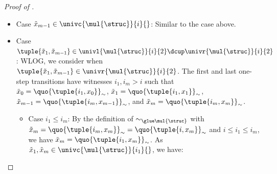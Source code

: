 \begin{proof}[Proof of ]
\begin{itemize}
\begin{itemize}
            We then have:
            \begin{center}
            \end{center}
            \item Case $\tilde{x}_{m-1} \in \univc{\mul{\struc}}{i}{}$:
            Similar to the case above.
            \item Case $\tuple{\tilde{x}_1, \tilde{x}_{m-1}} \in \univl{\mul{\struc}}{i}{2} \dcup \univr{\mul{\struc}}{i}{2}$:
            WLOG, we consider when $\tuple{\tilde{x}_1, \tilde{x}_{m-1}} \in \univr{\mul{\struc}}{i}{2}$.
            The first and last one-step transitions have witnesses $i_1, i_m > i$ such that
            $\tilde{x}_{0} = \quo{\tuple{i_1, x_{0}}}_{\sim}$,
            $\tilde{x}_{1} = \quo{\tuple{i_1, x_{1}}}_{\sim}$,
            $\tilde{x}_{m-1} = \quo{\tuple{i_m, x_{m-1}}}_{\sim}$, and
            $\tilde{x}_{m} = \quo{\tuple{i_m, x_m}}_{\sim}$.
            \begin{itemize}
                \item Case $i_{1} \le i_m$:
                By the definition of $\sim_{\glue \mul{\struc}}$ with $\tilde{x}_{m} = \quo{\tuple{i_m, x_m}}_{\sim} = \quo{\tuple{i, x_m}}_{\sim}$ and $i \le i_1 \le i_m$,
                we have $\tilde{x}_{m} = \quo{\tuple{i_{1}, x_m}}_{\sim}$.
                As $\tilde{x}_{1}, \tilde{x}_m \in \univc{\mul{\struc}}{i_1}{}$, we have:
                \begin{center}
\end{center}
\end{itemize}
\end{itemize}
\end{itemize}
\end{proof}
